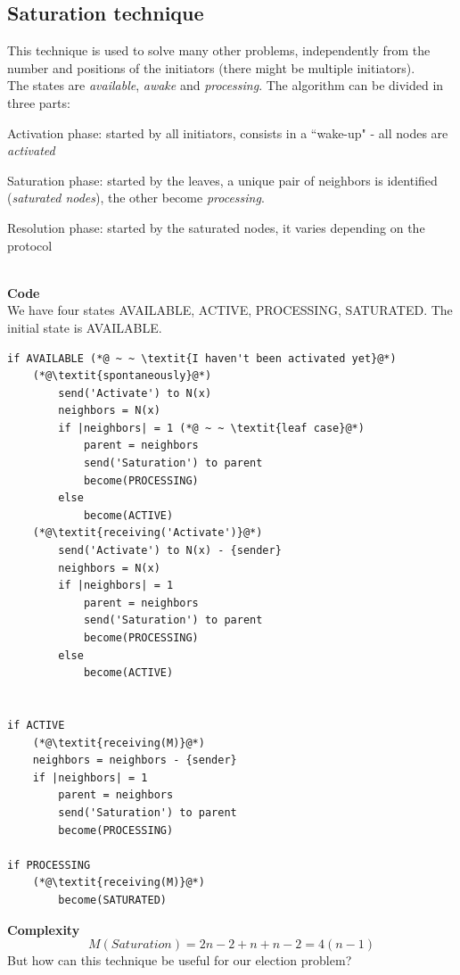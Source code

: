 \documentclass[paper=a4, fontsize=11pt]{scrartcl} %
\numberwithin{equation}{section} %
\numberwithin{figure}{section} %
\numberwithin{table}{section} %
\begin{document}
\subsection*{Saturation technique}
This technique is used to solve many other problems, independently from the number and positions of the initiators (there might be multiple initiators).\\
The states are \textit{available}, \textit{awake} and \textit{processing}. The algorithm can be divided in three parts:
\begin{compactitem}
\item Activation phase: started by all initiators, consists in a ``wake-up" -  all nodes are \textit{activated}
\item Saturation phase: started by the leaves, a unique pair of neighbors is identified (\textit{saturated nodes}), the other become \textit{processing}.
\item Resolution phase: started by the saturated nodes, it varies depending on the protocol
\end{compactitem}~\\
\textbf{Code} \\ We have four states AVAILABLE, ACTIVE, PROCESSING, SATURATED. The initial state is AVAILABLE.
\begin{lstlisting}
if AVAILABLE (*@ ~ ~ \textit{I haven't been activated yet}@*)
	(*@\textit{spontaneously}@*)
		send('Activate') to N(x)
		neighbors = N(x)
		if |neighbors| = 1 (*@ ~ ~ \textit{leaf case}@*)
			parent = neighbors
			send('Saturation') to parent
			become(PROCESSING)
		else
			become(ACTIVE)	
	(*@\textit{receiving('Activate')}@*)
		send('Activate') to N(x) - {sender}
		neighbors = N(x)
		if |neighbors| = 1
			parent = neighbors
			send('Saturation') to parent
			become(PROCESSING)
		else
			become(ACTIVE)


if ACTIVE
	(*@\textit{receiving(M)}@*)
	neighbors = neighbors - {sender}
	if |neighbors| = 1
		parent = neighbors
		send('Saturation') to parent
		become(PROCESSING)

if PROCESSING
	(*@\textit{receiving(M)}@*)
		become(SATURATED)					
\end{lstlisting}


\textbf{Complexity} 
$$M(Saturation) = 2n -2+n+n-2 = 4(n-1)$$ 
But how can this technique be useful for our election problem?
~ \\
\end{document}
